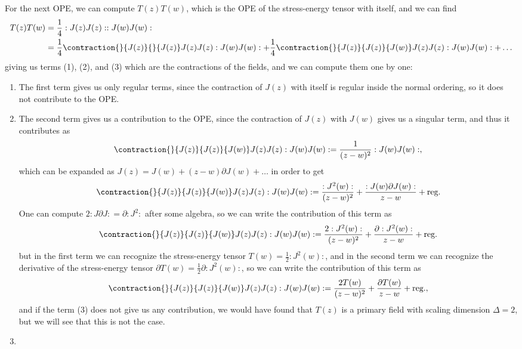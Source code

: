 For the next OPE, we can compute \(T(z)T(w)\), which is the OPE of the stress-energy tensor with itself, and we can find
\[
    \begin{aligned}
        T(z)T(w) & = \frac{1}{4} : J(z)J(z) : : J(w)J(w) :                                                                                                         \\
                 & = \frac{1}{4} \contraction{}{J(z)}{}{J(z)} J(z) J(z) : J(w)J(w) : + \frac{1}{4} \contraction{}{J(z)}{J(z)}{J(w)} J(z) J(z) : J(w)J(w) : + \dots
    \end{aligned}
\]
giving us terms (1), (2), and (3) which are the contractions of the fields, and we can compute them one by one:
\begin{enumerate}
    \item The first term gives us only regular terms, since the contraction of \(J(z)\) with itself is regular inside the normal ordering, so it does not contribute to the OPE.
    \item The second term gives us a contribution to the OPE, since the contraction of \(J(z)\) with \(J(w)\) gives us a singular term, and thus it contributes as
          \[
              \contraction{}{J(z)}{J(z)}{J(w)} J(z) J(z) : J(w)J(w) : = \frac{1}{(z-w)^2} : J(w)J(w) :,
          \]
          which can be expanded as \(J(z) = J(w) + (z-w) \partial J(w) + \dots\) in order to get
          \[
              \contraction{}{J(z)}{J(z)}{J(w)} J(z) J(z) : J(w)J(w) : = \frac{:J^2(w):}{(z-w)^2} + \frac{:J(w)\partial J(w):}{z-w} + \text{reg.}
          \]
          One can compute \(2 :J\partial J: = \partial :J^2: \) after some algebra, so we can write the contribution of this term as
          \[
              \contraction{}{J(z)}{J(z)}{J(w)} J(z) J(z) : J(w)J(w) : = \frac{2 :J^2(w):}{(z-w)^2} + \frac{\partial :J^2(w):}{z-w} + \text{reg.}
          \]
          but in the first term we can recognize the stress-energy tensor \(T(w) = \frac{1}{2} :J^2(w):\), and in the second term we can recognize the derivative of the stress-energy tensor \(\partial T(w) = \frac{1}{2} \partial :J^2(w):\), so we can write the contribution of this term as
          \[
              \contraction{}{J(z)}{J(z)}{J(w)} J(z) J(z) : J(w)J(w) : = \frac{2 T(w)}{(z-w)^2} + \frac{\partial T(w)}{z-w} + \text{reg.},
          \]
          and if the term (3) does not give us any contribution, we would have found that \(T(z)\) is a primary field with scaling dimension \(\Delta = 2\), but we will see that this is not the case.
    \item [...]

\end{enumerate}
